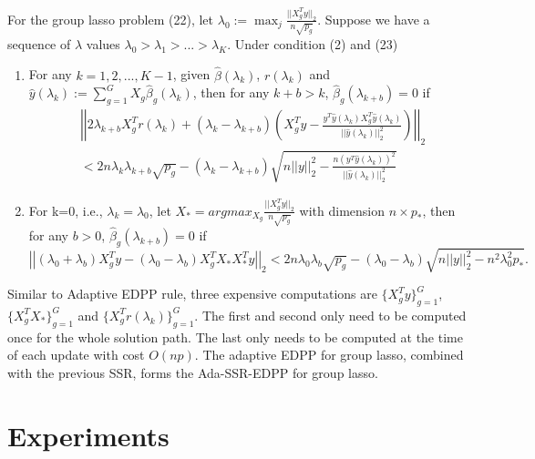 \begin{theorem}
For the group lasso problem (22), let $\lambda_0:=\max_j\frac{||X_g^Ty||_2}{n\sqrt{p_g}}$. Suppose we have a sequence of $\lambda$ values $\lambda_0>\lambda_1>...>\lambda_K$. Under condition (2) and (23)
    \begin{enumerate}
        \item For any $k=1,2,...,K-1$, given $\hat{\beta}(\lambda_k)$, $r(\lambda_k)$ and $\hat{y}(\lambda_k):=\sum_{g=1}^GX_g\hat{\beta}_g(\lambda_k)$, then for any  $k+b>k$, $\hat{\beta}_g(\lambda_{k+b})=0$ if
        \begin{equation}
            \begin{split}
                &\left|\left|2\lambda_{k+b}X_g^Tr(\lambda_k)+(\lambda_k-\lambda_{k+b})\left( X_g^Ty-\frac{y^T\hat{y}(\lambda_k)X_g^T\hat{y}(\lambda_k)}{||\hat{y}(\lambda_k)||_2^2}\right)\right|\right|_2\\
                &<2n\lambda_k\lambda_{k+b}\sqrt{p_g}-(\lambda_k-\lambda_{k+b})\sqrt{n||y||_2^2-\frac{n(y^T\hat{y}(\lambda_k))^2}{||\hat{y}(\lambda_k)||_2^2}}
            \end{split}
        \end{equation}
        \item For k=0, i.e., $\lambda_k=\lambda_0$, let $X_*=argmax_{X_g}\frac{||X_g^Ty||_2}{n\sqrt{p_g}}$ with dimension $n\times p_*$, then for any $b>0$, $\hat{\beta}_g(\lambda_{k+b})=0$ if
        \begin{equation}
        \left|\left|(\lambda_0+\lambda_b)X_g^Ty-(\lambda_0-\lambda_b)X_g^TX_*X_*^Ty\right|\right|_2<2n\lambda_0\lambda_b\sqrt{p_g}-(\lambda_0-\lambda_b)\sqrt{n||y||_2^2-n^2\lambda_0^2p_*}.
    \end{equation}
    \end{enumerate}
\end{theorem}

Similar to Adaptive EDPP rule, three expensive computations are $\{X_g^Ty\}_{g=1}^G$, $\{X_g^TX_*\}_{g=1}^G$ and $\{X_g^Tr(\lambda_k)\}_{g=1}^G$. The first and second only need to be computed once for the whole solution path. The last only needs to be computed at the time of each update with cost $O(np)$. The adaptive EDPP for group lasso, combined with the previous SSR, forms the Ada-SSR-EDPP for group lasso.

\section{Experiments}
\label{sec:5}

